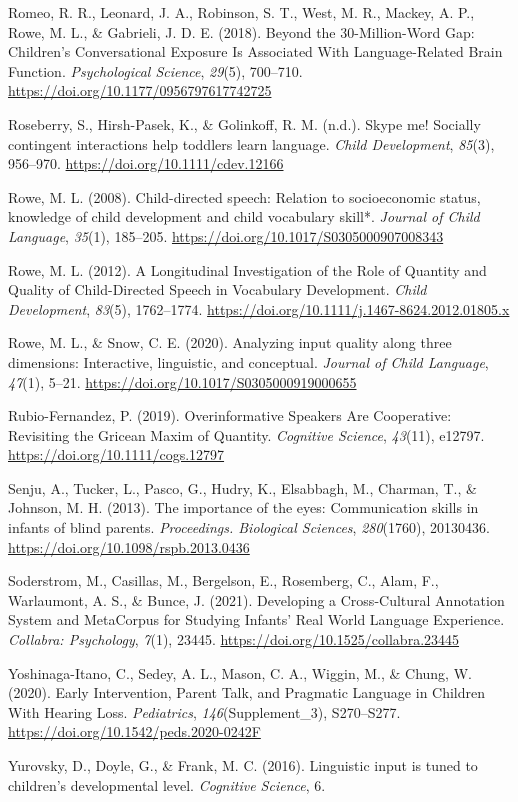 \documentclass[english,man]{apa6}
\begin{document}
\leavevmode\hypertarget{ref-romeo2018}{}%
Romeo, R. R., Leonard, J. A., Robinson, S. T., West, M. R., Mackey, A. P., Rowe, M. L., \& Gabrieli, J. D. E. (2018). Beyond the 30-Million-Word Gap: Children's Conversational Exposure Is Associated With Language-Related Brain Function. \emph{Psychological Science}, \emph{29}(5), 700--710. \url{https://doi.org/10.1177/0956797617742725}

\leavevmode\hypertarget{ref-roseberry2014}{}%
Roseberry, S., Hirsh-Pasek, K., \& Golinkoff, R. M. (n.d.). Skype me! Socially contingent interactions help toddlers learn language. \emph{Child Development}, \emph{85}(3), 956--970. \url{https://doi.org/10.1111/cdev.12166}

\leavevmode\hypertarget{ref-rowe2008}{}%
Rowe, M. L. (2008). Child-directed speech: Relation to socioeconomic status, knowledge of child development and child vocabulary skill*. \emph{Journal of Child Language}, \emph{35}(1), 185--205. \url{https://doi.org/10.1017/S0305000907008343}

\leavevmode\hypertarget{ref-rowe2012}{}%
Rowe, M. L. (2012). A Longitudinal Investigation of the Role of Quantity and Quality of Child-Directed Speech in Vocabulary Development. \emph{Child Development}, \emph{83}(5), 1762--1774. \url{https://doi.org/10.1111/j.1467-8624.2012.01805.x}

\leavevmode\hypertarget{ref-rowe2020}{}%
Rowe, M. L., \& Snow, C. E. (2020). Analyzing input quality along three dimensions: Interactive, linguistic, and conceptual. \emph{Journal of Child Language}, \emph{47}(1), 5--21. \url{https://doi.org/10.1017/S0305000919000655}

\leavevmode\hypertarget{ref-rubio-fernandez2019}{}%
Rubio-Fernandez, P. (2019). Overinformative Speakers Are Cooperative: Revisiting the Gricean Maxim of Quantity. \emph{Cognitive Science}, \emph{43}(11), e12797. \url{https://doi.org/10.1111/cogs.12797}

\leavevmode\hypertarget{ref-senju2013}{}%
Senju, A., Tucker, L., Pasco, G., Hudry, K., Elsabbagh, M., Charman, T., \& Johnson, M. H. (2013). The importance of the eyes: Communication skills in infants of blind parents. \emph{Proceedings. Biological Sciences}, \emph{280}(1760), 20130436. \url{https://doi.org/10.1098/rspb.2013.0436}

\leavevmode\hypertarget{ref-soderstrom2021}{}%
Soderstrom, M., Casillas, M., Bergelson, E., Rosemberg, C., Alam, F., Warlaumont, A. S., \& Bunce, J. (2021). Developing a Cross-Cultural Annotation System and MetaCorpus for Studying Infants' Real World Language Experience. \emph{Collabra: Psychology}, \emph{7}(1), 23445. \url{https://doi.org/10.1525/collabra.23445}

\leavevmode\hypertarget{ref-yoshinaga-itano2020}{}%
Yoshinaga-Itano, C., Sedey, A. L., Mason, C. A., Wiggin, M., \& Chung, W. (2020). Early Intervention, Parent Talk, and Pragmatic Language in Children With Hearing Loss. \emph{Pediatrics}, \emph{146}(Supplement\_3), S270--S277. \url{https://doi.org/10.1542/peds.2020-0242F}

\leavevmode\hypertarget{ref-yurovsky2016}{}%
Yurovsky, D., Doyle, G., \& Frank, M. C. (2016). Linguistic input is tuned to children's developmental level. \emph{Cognitive Science}, 6.
\end{document}
